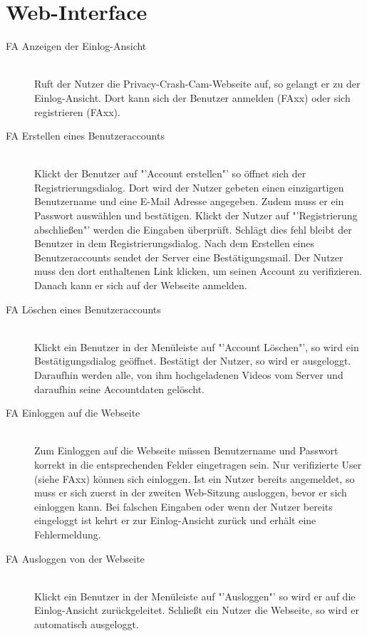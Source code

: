 \section{Web-Interface}
\begin{description}
\item[FA Anzeigen der Einlog-Ansicht] \hfill \\
Ruft der Nutzer die Privacy-Crash-Cam-Webseite auf, so gelangt er zu der Einlog-Ansicht. Dort kann sich der Benutzer anmelden (FAxx) oder sich registrieren (FAxx).

\item[FA Erstellen eines Benutzeraccounts] \hfill \\
Klickt der Benutzer auf "'Account erstellen"' so öffnet sich der Registrierungsdialog. Dort wird der Nutzer gebeten einen einzigartigen Benutzername und eine E-Mail Adresse angegeben. Zudem muss er ein Passwort auswählen und bestätigen. Klickt der Nutzer auf "'Registrierung abschließen"' werden die Eingaben überprüft. Schlägt dies fehl bleibt der Benutzer in dem Registrierungsdialog. Nach dem Erstellen eines Benutzeraccounts sendet der Server eine Bestätigungsmail. Der Nutzer muss den dort enthaltenen Link klicken, um seinen Account zu verifizieren. Danach kann er sich auf der Webseite anmelden.

\item[FA Löschen eines Benutzeraccounts] \hfill \\
Klickt ein Benutzer in der Menüleiste auf "'Account Löschen"', so wird ein Bestätigungsdialog geöffnet. Bestätigt der Nutzer, so wird er ausgeloggt. Daraufhin werden alle, von ihm hochgeladenen Videos vom Server und daraufhin seine Accountdaten gelöscht.

\item[FA Einloggen auf die Webseite] \hfill \\
Zum Einloggen auf die Webseite müssen Benutzername und Passwort korrekt in die entsprechenden Felder eingetragen sein. Nur verifizierte User (siehe FAxx) können sich einloggen. Ist ein Nutzer bereits angemeldet, so muss er sich zuerst in der zweiten Web-Sitzung ausloggen, bevor er sich einloggen kann. Bei falschen Eingaben oder wenn der Nutzer bereits eingeloggt ist kehrt er zur Einlog-Ansicht zurück und erhält eine Fehlermeldung.

\item[FA Ausloggen von der Webseite] \hfill \\
Klickt ein Benutzer in der Menüleiste auf "'Ausloggen"' so wird er auf die Einlog-Ansicht zurückgeleitet. Schließt ein Nutzer die Webseite, so wird er automatisch ausgeloggt.


\end{description}
